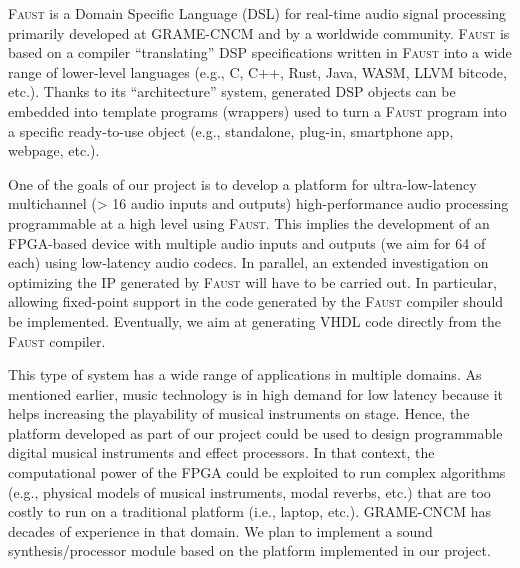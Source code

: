 \documentclass[a4paper,10pt]{article}
\newcommand{\F}{\textsc{Faust}}
\newcommand{\PP}{our project}
\begin{document}
\F{} \cite{Orlarey2009} is a Domain Specific Language (DSL) for real-time audio signal processing primarily developed at GRAME-CNCM and by a worldwide community. \F{} is based on a compiler ``translating'' DSP specifications written in \F{} into a wide range of lower-level languages (e.g., C, C++, Rust, Java, WASM, LLVM bitcode, etc.). Thanks to its ``architecture'' system, generated DSP objects can be embedded into template programs (wrappers) used to turn a \F{} program into a specific ready-to-use object (e.g., standalone, plug-in, smartphone app, webpage, etc.). 


One of the goals of \PP{} is to develop a platform for ultra-low-latency multichannel (> 16 audio inputs and outputs) high-performance audio processing programmable at a high level using \F{}. This implies the development of an FPGA-based device with multiple audio inputs and outputs (we aim for 64 of each) using low-latency audio codecs. In parallel, an extended investigation on optimizing the IP generated by \F{} will have to be carried out. In particular, allowing fixed-point support in the code generated by the \F{} compiler should be implemented. Eventually, we aim at generating VHDL code directly from the \F{} compiler. %

This type of system has a wide range of applications in multiple domains. As mentioned earlier, music technology is in high demand for low latency because it helps increasing the playability of musical instruments on stage. Hence, the platform developed as part of \PP{} could be used to design programmable digital musical instruments and effect processors. In that context, the computational power of the FPGA could be exploited to run complex algorithms (e.g., physical models of musical instruments, modal reverbs, etc.) that are too costly to run on a traditional platform (i.e., laptop, etc.). GRAME-CNCM has decades of experience in that domain. We plan to implement a sound synthesis/processor module based on the platform implemented in \PP{}.
\end{document}
